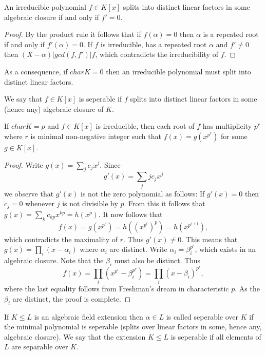 \documentclass[twoside, a4paper, 10pt]{amsart}
\begin{document}
\begin{lemma} An irreducible polynomial $f \in K[x]$ splits into distinct linear factors in some algebraic closure if and only if $f' = 0$.

\end{lemma}

\begin{proof} By the product rule it follows that if $f(\alpha) = 0$ then $\alpha$ is a repeated root if and only if $f'(\alpha) = 0$. If $f$ is irreducible, has a repeated root $\alpha$ and $f' \neq 0$ then $(X-\alpha) | gcd(f, f') | f$, which contradicts the irreducibility of $f$. \end{proof}

As a consequence, if $char K = 0$ then an irreducible polynomial must split into distinct linear factors.

\begin{mydef} We say that $f \in K[x]$ is seperable if $f$ splits into distinct linear factors in some (hence any) algebraic closure of $K$.

\end{mydef}

\begin{thm} If $char K = p$ and $f \in K[x]$ is irreducible, then each root of $f$ has multiplicity $p^r$ where $r$ is minimal non-negative integer such that $f(x) = g(x^{p^r})$ for some $g \in K[x]$.

\end{thm}

\begin{proof} Write $g(x) = \sum_j c_j x^j$. Since $$g'(x) = \sum_{j} j c_j x^j$$ we observe that $g'(x)$ is not the zero polynomial as follows: If $g'(x) = 0$ then $c_j = 0$ whenever $j$ is not divisible by $p$. From this it follows that $g(x) = \sum_k c_{kp} x^{kp} = h(x^p)$. It now follows that $$f(x) = g(x^{p^r}) = h((x^{p^r})^p) =  h(x^{p^{r+1}}),$$ which contradicts the maximality of $r$. Thus $g'(x) \neq 0$. This means that $g(x) = \prod_i (x - \alpha_i)$ where $\alpha_i$ are distinct. Write $\alpha_i = \beta_i^{p^r}$, which exists in an algebraic closure. Note that the $\beta_i$ must also be distinct. Thus $$f(x) = \prod_i (x^{p^r} - \beta_i^{p^r}) = \prod_i (x- \beta_i)^{p^r},  $$ where the last equality follows from Freshman's dream in characteristic $p$. As the $\beta_i$ are distinct, the proof is complete. \end{proof}

\begin{mydef} If $K \leq L$ is an algebraic field extension then $\alpha \in L$ is called seperable over $K$ if the minimal polynomial is seperable (splits over linear factors in some, hence any, algebraic closure). We say that the extension $K \leq L$ is seperable if all elements of $L$ are separable over $K$.

\end{mydef}
\end{document}
